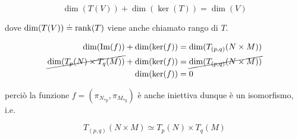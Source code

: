 {{	\begin{equation*}
		\dim(T(V)) + \dim(\ker(T)) = \dim(V)
	\end{equation*}
	
	dove $ \dim(T(V)) \doteq \rank(T) $ viene anche chiamato rango di $ T $.%
}

\begin{align}
	\begin{split}
		\dim(\Im(f)) + \dim(\ker(f)) &= \dim(T_{(p,q)}(N \times M)) \\
		\cancel{ \dim(T_{p}(N) \times T_{q}(M)) } + \dim(\ker(f)) &= \cancel{ \dim(T_{(p,q)}(N \times M)) } \\
		\dim(\ker(f)) &= 0
	\end{split}
\end{align}

perciò la funzione $ f = (\pi_{N_{*p}},\pi_{M_{*q}}) $ è anche iniettiva dunque è un isomorfismo, i.e.

\begin{equation}
	T_{(p,q)}(N \times M) \simeq T_{p}(N) \times T_{q}(M)
\end{equation}
}


